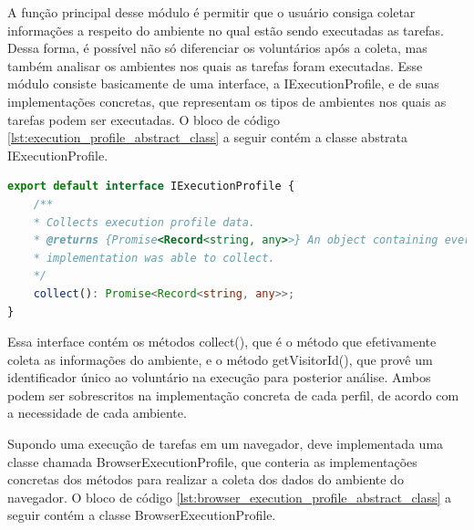 \documentclass[12pt]{tcc}
\begin{document}
A função principal desse módulo é permitir que o usuário consiga coletar informações a respeito do ambiente no qual estão sendo executadas as tarefas. Dessa forma, é possível não só diferenciar os voluntários após a coleta, mas também analisar os ambientes nos quais as tarefas foram executadas. Esse módulo consiste basicamente de uma interface, a IExecutionProfile, e de suas implementações concretas, que representam os tipos de ambientes nos quais as tarefas podem ser executadas. O bloco de código \ref{lst:execution_profile_abstract_class} a seguir contém a classe abstrata IExecutionProfile.

\begin{lstlisting}[label={lst:execution_profile_abstract_class}, caption={Implementação da classe responsável por representar um perfil de execução.}, language=TypeScript, breaklines=true]
export default interface IExecutionProfile {
	/**
	* Collects execution profile data.
	* @returns {Promise<Record<string, any>>} An object containing every execution profile data the
	* implementation was able to collect.
	*/
	collect(): Promise<Record<string, any>>;
}
\end{lstlisting}

Essa interface contém os métodos collect(), que é o método que efetivamente coleta as informações do ambiente, e o método getVisitorId(), que provê um identificador único ao voluntário na execução para posterior análise. Ambos podem ser sobrescritos na implementação concreta de cada perfil, de acordo com a necessidade de cada ambiente.

Supondo uma execução de tarefas em um navegador, deve implementada uma classe chamada BrowserExecutionProfile, que conteria as implementações concretas dos métodos para realizar a coleta dos dados do ambiente do navegador. O bloco de código \ref{lst:browser_execution_profile_abstract_class} a seguir contém a classe BrowserExecutionProfile.
\end{document}
